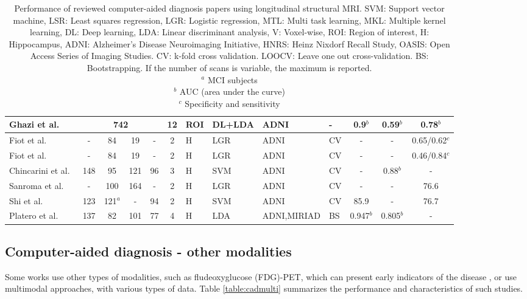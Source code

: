 \begin{table}
{\begin{tabular}{@{}lcccccllllccc@{}}
Ghazi et al.\ \cite{Ghazi2019} & \multicolumn{4}{c}{742} & 12 & ROI & DL+LDA & ADNI & - & 0.9$^{b}$  & 0.59$^{b}$  & 0.78$^{b}$  \\ \midrule 
Fiot et al.\ \cite{Fiot2012} & - & 84 & 19 & - & 2 & H & LGR & ADNI & CV & - & - & 0.65/0.62$^{c}$ \\
Fiot et al.\ \cite{Fiot2014} & - & 84 & 19 & - & 2 & H & LGR & ADNI & CV & - & - & 0.46/0.84$^{c}$ \\
Chincarini et al.\ \cite{chincarini} & 148 & 95 & 121 & 96 & 3 & H & SVM & ADNI & CV & - & 0.88$^{b}$  & - \\ 
Sanroma et al.\ \cite{Sanroma2017}  & - & 100 & 164 & - & 2 & H & LGR & ADNI & CV & - & - & 76.6 \\
Shi et al.\ \cite{Shi2017} & 123 & 121$^{a}$ & - & 94 & 2 & H & SVM & ADNI & CV & 85.9 & - & 76.7 \\
Platero et al.\ \cite{Platero2019} & 137 & 82 & 101 & 77 & 4 & H & LDA & ADNI,MIRIAD & BS & 0.947$^{b}$ & 0.805$^{b}$ & - \\
 \bottomrule
\end{tabular}}
\caption[Performance of reviewed computer-aided diagnosis papers using longitudinal structural MRI.]{\footnotesize Performance of reviewed computer-aided diagnosis papers using longitudinal structural MRI. SVM: Support vector machine, LSR: Least squares regression, LGR: Logistic regression, MTL: Multi task learning, MKL: Multiple kernel learning, DL: Deep learning, LDA: Linear discriminant analysis, V: Voxel-wise, ROI: Region of interest, H: Hippocampus, ADNI: Alzheimer’s Disease Neuroimaging Initiative, HNRS: Heinz Nixdorf Recall Study, OASIS: Open Access Series of Imaging Studies. CV: k-fold cross validation. LOOCV: Leave one out cross-validation. BS: Bootstrapping. If the number of scans is variable, the maximum is reported. \\
         $^{a}$ MCI subjects \\
         $^{b}$ AUC (area under the curve) \\
         $^{c}$ Specificity and sensitivity \\}\label{table:cadmri}
\end{table}
\normalsize

\subsection{Computer-aided diagnosis - other modalities}

Some works use other types of modalities, such as fludeoxyglucose (FDG)-PET, which can present early indicators of the disease \cite{Jack2013}, or use multimodal approaches, with various types of data. Table \ref{table:cadmulti} summarizes the performance and characteristics of such studies. \\


